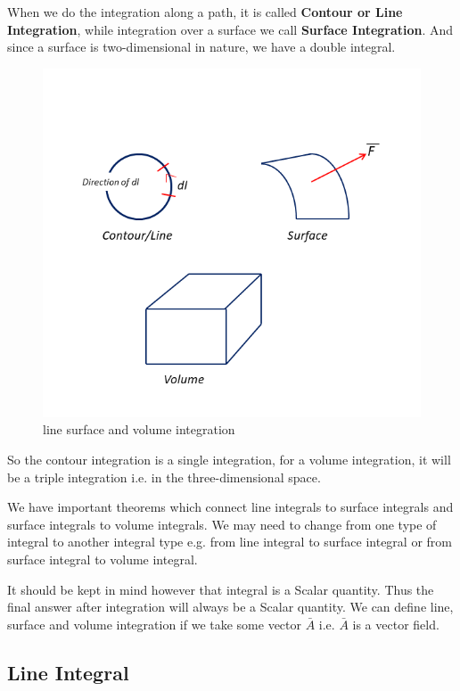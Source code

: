 When we do the integration along a path, it is called \textbf{Contour or Line Integration}, while integration over a surface we call \textbf{Surface Integration}. And since a surface is two-dimensional in nature, we have a double integral.

\begin{figure}[ht]
\centering
\includegraphics[width=1\linewidth]{graphics/fig17.3}
\caption{line surface and volume integration}
\end{figure}

So the contour integration is a single integration, for a volume integration, it will be a triple integration i.e. in the three-dimensional space.

We have important theorems which connect line integrals to surface integrals and surface integrals to volume integrals. We may need to change from one type of integral to another integral type e.g. from line integral to surface integral or from surface integral to volume integral.

It should be kept in mind however that integral is a Scalar quantity. Thus the final answer after integration will always be a Scalar quantity. We can define line, surface and volume integration if we take some vector $\bar{A}$ i.e. $\bar{A}$ is a vector field. 

\subsection{Line Integral}

